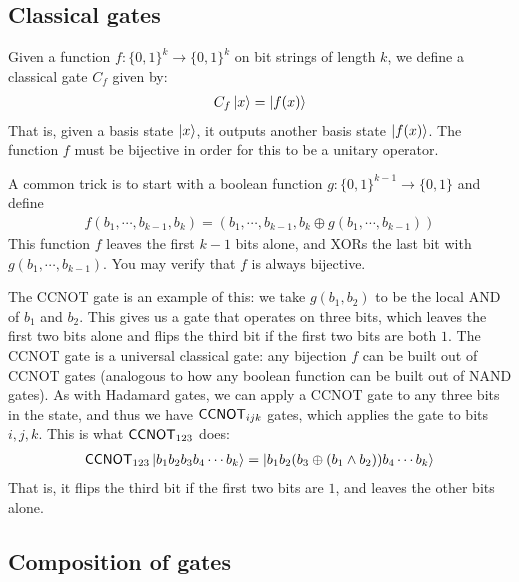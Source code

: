\subsection{Classical gates}

Given a function $f : \{0,1\}^k \to \{0,1\}^k$ on bit strings of length $k$, we define a classical gate $C_f$ given by:
\begin{align}
  C_f \ket{x} = \ket{f(x)}         \label{eqn:classicalgate}
\end{align}
That is, given a basis state $\ket{x}$, it outputs another basis state $\ket{f(x)}$.
The function $f$ must be bijective in order for this to be a unitary operator.

A common trick is to start with a boolean function $g : \{0,1\}^{k-1} \to \{0,1\}$ and define
\begin{align}
  f(b_1,\cdots,b_{k-1},b_k) = (b_1,\cdots,b_{k-1}, b_k \oplus g(b_1,\cdots,b_{k-1}))     \label{eqn:xortrick}
\end{align}
This function $f$ leaves the first $k-1$ bits alone, and XORs the last bit with $g(b_1,\cdots,b_{k-1})$.
You may verify that $f$ is always bijective.

The CCNOT gate is an example of this: we take $g(b_1,b_2)$ to be the local AND of $b_1$ and $b_2$.
This gives us a gate that operates on three bits, which leaves the first two bits alone and flips the third bit if the first two bits are both $1$.
The CCNOT gate is a universal classical gate: any bijection $f$ can be built out of CCNOT gates (analogous to how any boolean function can be built out of NAND gates).
As with Hadamard gates, we can apply a CCNOT gate to any three bits in the state, and thus we have $\mathsf{CCNOT}_{ijk}$ gates,
which applies the gate to bits $i,j,k$. This is what $\mathsf{CCNOT}_{123}$ does:
\begin{align*}
  \mathsf{CCNOT}_{123} \ket{b_1 b_2 b_3 b_4 \cdots b_k} = \ket{b_1 b_2 (b_3 \oplus (b_1 \wedge b_2)) b_4 \cdots b_k}
\end{align*}
That is, it flips the third bit if the first two bits are $1$, and leaves the other bits alone.

\subsection{Composition of gates}

